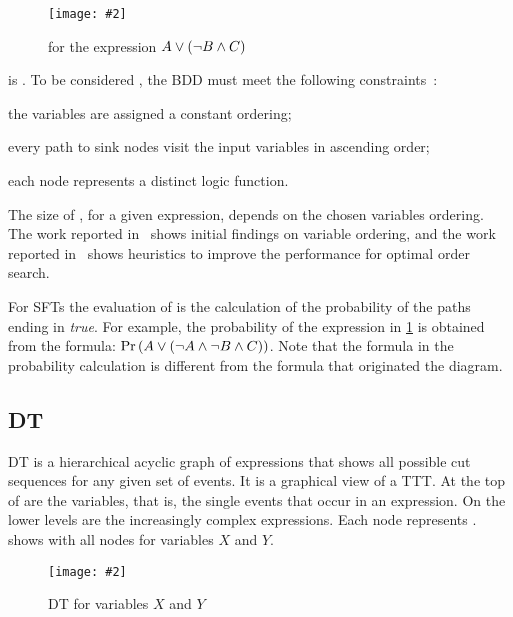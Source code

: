 \documentclass[12pt,openright,twoside,a4paper,oldfontcommands,english,brazil,final]{abntex2}
\theoremstyle{theo}
\newcommand{\includegraphicsaspectratio}[2][1]{%
  \texttt{[image: \#2]}%
}
\newcommand{\parsin}[1]{\ensuremath\left( #1 \right)}
\def\probabilityop{\ensuremath \Pr}
\newcommand{\probability}[1]{\ensuremath \probabilityop\parsin{#1}}
\begin{document}
\begin{figure}[htb]
  \centering
  \includegraphicsaspectratio[0.25]{bdd-diagram-for-example-expression}
  \caption{ for the expression $A \lor \parsin{\lnot B \land C}$}
  \label{fig:bdd-diagram-for-example-expression}
\end{figure}

 is .
To be considered , the \ac{BDD} must meet the following constraints~\cite{BRB1990}:
%
\begin{alineas}
  \item the variables are assigned a constant ordering;
  \item every path to sink nodes visit the input variables in ascending order;
  \item each node represents a distinct logic function.
\end{alineas}
%
The size of , for a given expression, depends on the chosen variables ordering.
The work reported in~\cite{Rudell1993} shows initial findings on variable ordering, and the work reported in~\cite{KH2014} shows heuristics to improve the performance for optimal order search.

For \acp{SFT} the evaluation of  is the calculation of the probability of the paths ending in \emph{true}.
For example, the probability of the expression in \cref{fig:bdd-diagram-for-example-expression} is obtained from the formula: $\probability{A \lor \parsin{\lnot A \land \lnot B \land C}}$. Note that the formula in the probability calculation is different from the formula that originated the diagram.

\subsection{\Acl*{DT}}
\label{sec:dependency-trees}

\Acf{DT} is a hierarchical acyclic graph of expressions that shows all possible cut sequences for any given set of events.
It is a graphical view of a \ac{TTT}.
At the top of  are the variables, that is, the single events that occur in an expression.
On the lower levels are the increasingly complex expressions.
Each node represents .
 shows  with all nodes for variables $X$ and $Y$.

\begin{figure}[htb]
  \centering
  \includegraphicsaspectratio[0.5]{simple-dependency-tree}
  \caption{\acs*{DT} for variables $X$ and $Y$}
  \label{fig:simple-dependency-tree}
\end{figure}
\end{document}
